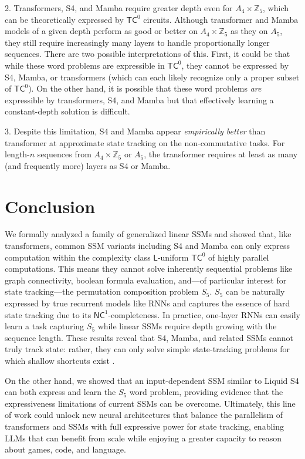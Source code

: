     2. Transformers, S4, and Mamba require greater depth even for $A_4 \times \mathbb{Z}_5$, which can be theoretically expressed by $\mathsf{TC}^0$ circuits. Although transformer and Mamba models of a given depth perform as good or better on $A_4 \times \mathbb{Z}_5$ as they on $A_5$, they still require increasingly many layers to handle proportionally longer sequences. There are two possible interpretations of this. First, it could be that while these word problems are expressible in $\mathsf{TC}^0$, they cannot be expressed by S4, Mamba, or transformers (which can each likely recognize only a proper subset of $\mathsf{TC}^0$). On the other hand, it is possible that these word problems \emph{are} expressible by transformers, S4, and Mamba but that effectively learning a constant-depth solution is difficult.

    3. Despite this limitation, S4 and Mamba appear \emph{empirically better} than transformer at approximate state tracking on the non-commutative tasks. For length-$n$ sequences from $A_4\times\mathbb{Z}_5$ or $A_5$, the transformer requires at least as many (and frequently more) layers as S4 or Mamba.

\section{Conclusion}

We formally analyzed a family of generalized linear SSMs and showed that, like transformers, common SSM variants including S4 and Mamba can only express computation within the complexity class $\mathsf{L}$-uniform $\mathsf{TC}^0$ of highly parallel computations. This means they cannot solve inherently sequential problems like graph connectivity, boolean formula evaluation, and---of particular interest for state tracking---the permutation composition problem $S_5$. $S_5$ can be naturally expressed by true recurrent models like RNNs and captures the essence of hard state tracking due to its $\mathsf{NC}^1$-completeness. In practice, one-layer RNNs can easily learn a task capturing $S_5$ while linear SSMs require depth growing with the sequence length. These results reveal that S4, Mamba, and related SSMs cannot truly track state: rather, they can only solve simple state-tracking problems for which shallow shortcuts exist \citep{liu2023transformers}.

On the other hand, we showed that an input-dependent SSM similar to  Liquid S4 can both express and learn the $S_5$ word problem, providing evidence that the expressiveness limitations of current SSMs can be overcome. Ultimately, this line of work could unlock new neural architectures that balance the parallelism of transformers and SSMs with full expressive power for state tracking, enabling LLMs that can benefit from scale while enjoying a greater capacity to reason about games, code, and language.

